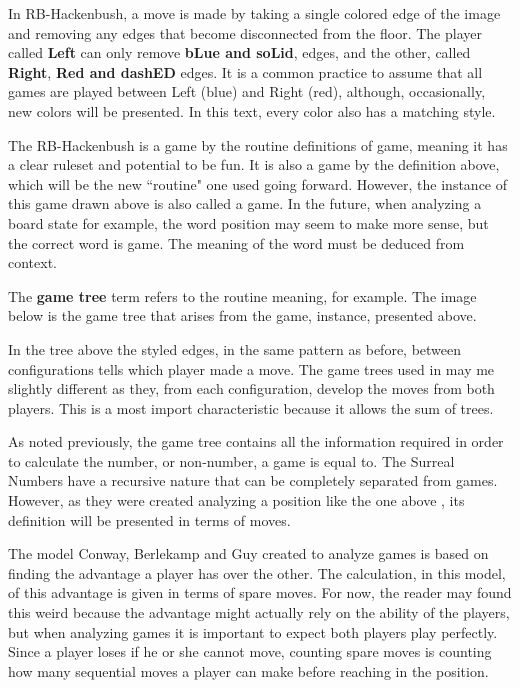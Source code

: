 In RB-Hackenbush, a move is made by taking a single colored edge of the image and removing any edges that become disconnected from the floor. The player called \textbf{Left} can only remove \textbf{bLue and soLid}, edges, and the other, called \textbf{Right}, \textbf{Red and dashED} edges. It is a common practice to assume that all games are played between Left (blue) and Right (red), although, occasionally, new colors will be presented. In this text, every color also has a matching style.

The RB-Hackenbush is a game by the routine definitions of game, meaning it has a clear ruleset and potential to be fun. It is also a game by the definition above, which will be the new ``routine" one used going forward. However, the instance of this game drawn above is also called a game. In the future, when analyzing a board state for example, the word position may seem to make more sense, but the correct word is game. The meaning of the word must be deduced from context.

The \textbf{game tree} term refers to the routine meaning, for example. The image below is the game tree that arises from the game, instance, presented above.




In the tree above the styled edges, in the same pattern as before, between configurations tells which player made a move. The game trees used in  may me slightly different
as they, from each configuration, develop the moves from both players. This is a most import characteristic because it allows the sum of trees.

As noted previously, the game tree contains all the information required in order to calculate the number, or non-number, a game is equal to. The Surreal Numbers  have a recursive nature that can be completely separated from games. However, as they were created analyzing a position like the one above , its definition will be presented in terms of moves.

The model Conway, Berlekamp and Guy created to analyze games is based on finding the advantage a player has over the other. The calculation, in this model, of this advantage is given in terms of spare moves. For now, the reader may found this weird because the advantage might actually rely on the ability of the players, but when analyzing games it is important to expect both players play perfectly. Since a player loses if he or she cannot move, counting spare moves is counting how many sequential moves a player can make before reaching  in the position.

